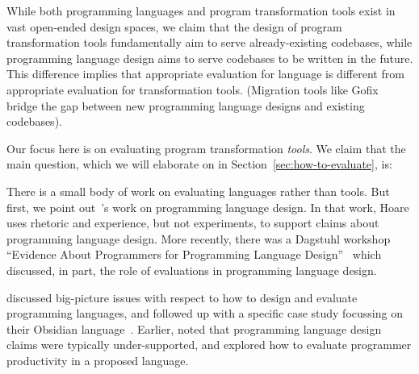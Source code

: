 While both programming languages and program transformation tools exist
in vast open-ended design spaces, we claim that the design of program transformation
tools fundamentally aim to serve already-existing codebases, while programming 
language design aims to serve codebases to be written in the future.
This difference implies that appropriate evaluation for language is different 
from appropriate evaluation for transformation tools.
(Migration tools like Gofix~\cite{cox11:_introd_gofix} bridge the gap between new programming language designs
and existing codebases).

Our focus here is on evaluating program transformation \emph{tools}.
We claim that the main question, which we will elaborate on in Section~\ref{sec:how-to-evaluate}, is:

\begin{center}
\end{center}

There is a small body of work on evaluating languages rather than tools.
But first, we point out~'s work on programming language
design. In that work, Hoare uses rhetoric and experience, but not experiments,
to support claims about programming language design. More recently,
there was a Dagstuhl workshop ``Evidence About Programmers for Programming
Language Design''~\cite{stefik18:_eviden_about_progr_progr_languag_desig} which discussed, in part, the role of evaluations in programming language design.


discussed big-picture issues with respect to how to design and evaluate programming languages, and followed up with a specific case study focussing on their Obsidian
language~\cite{coblenz20:_can_advan_type_system_be_usabl}.
Earlier,  noted that programming 
language design claims were typically under-supported, and  explored how to evaluate programmer productivity in a
proposed language. 


